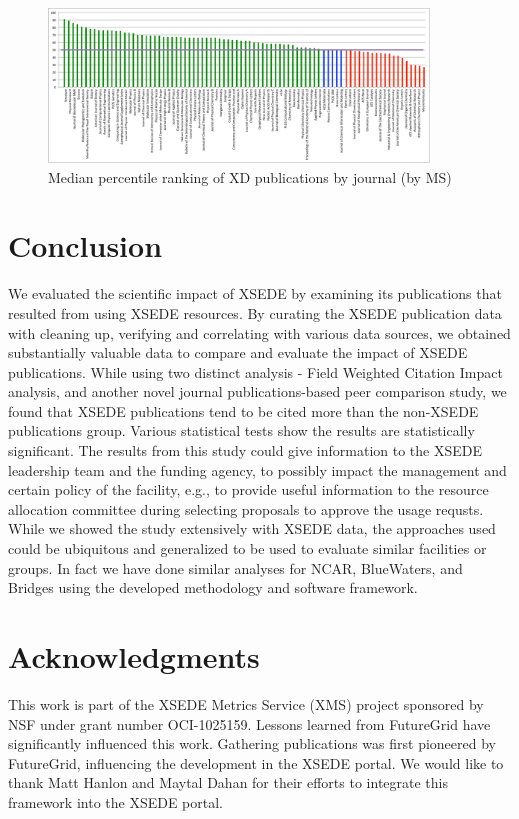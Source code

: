 \documentclass{sig-alternate}
\begin{document}
\begin{figure}[htb!]
  \centering
    \includegraphics[width=0.9\textwidth]{images/ms_peers_byj_median_10.pdf}
    \caption{Median percentile ranking of XD publications by journal (by MS)}
    \label{F:ms_peers_byj_median}
\end{figure}

\section{Conclusion} \label{S:conclusion}

We evaluated the scientific impact of XSEDE by examining its publications that
resulted from using XSEDE resources. By curating the XSEDE publication data with
cleaning up, verifying and correlating with various data sources, we obtained
substantially valuable data to compare and evaluate the impact of XSEDE publications.
While using two distinct analysis - Field Weighted Citation Impact analysis,
and another novel journal publications-based peer comparison study, we found that
XSEDE publications tend to be cited more than the non-XSEDE publications group.
Various statistical tests show the results are statistically significant.
The results from this study could give information to the XSEDE leadership team
and the funding agency, to possibly impact the management and certain policy
of the facility, e.g., to provide useful information to the resource allocation
committee during selecting proposals to approve the usage requsts.
While we showed the study extensively with XSEDE data, the approaches used could
be ubiquitous and generalized to be used to evaluate similar facilities or groups.
In fact we have done similar analyses for NCAR, BlueWaters, and Bridges using the
developed methodology and software framework.


\section{Acknowledgments}

This work is part of the XSEDE Metrics Service (XMS) project sponsored
by NSF under grant number OCI-1025159. Lessons learned from FutureGrid
have significantly influenced this work. Gathering publications was
first pioneered by FutureGrid, influencing the development in the XSEDE
portal. We would like to thank Matt Hanlon and Maytal Dahan for their
efforts to integrate this framework into the XSEDE portal.


 
 
\end{document}
